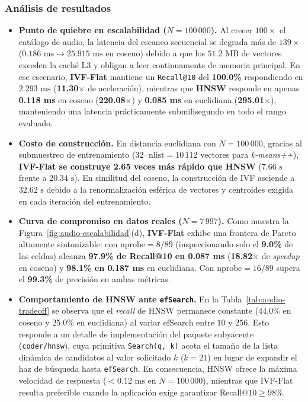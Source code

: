 \documentclass[11pt,a4paper]{article}
\begin{document}
\subsubsection{Análisis de resultados}

\begin{itemize}
  \item \textbf{Punto de quiebre en escalabilidad ($N = 100\,000$).} Al crecer $100\times$ el catálogo de audio, la latencia del escaneo secuencial se degrada más de $139\times$ ($0.186\text{ ms} \rightarrow 25.915\text{ ms}$ en coseno) debido a que los $51.2\text{ MB}$ de vectores exceden la caché L3 y obligan a leer continuamente de memoria principal. En ese escenario, \textbf{IVF-Flat} mantiene un \texttt{Recall@10} del \textbf{100.0\%} respondiendo en $2.293\text{ ms}$ (\textbf{11.30$\times$} de aceleración), mientras que \textbf{HNSW} responde en apenas \textbf{0.118 ms} en coseno (\textbf{220.08$\times$}) y \textbf{0.085 ms} en euclidiana (\textbf{295.01$\times$}), manteniendo una latencia prácticamente submilisegundo en todo el rango evaluado.
  \item \textbf{Costo de construcción.} En distancia euclidiana con $N = 100\,000$, gracias al submuestreo de entrenamiento ($32 \cdot \text{nlist} = 10\,112$ vectores para \emph{k-means++}), \textbf{IVF-Flat se construye 2.65 veces más rápido que HNSW} ($7.66\text{ s}$ frente a $20.34\text{ s}$). En similitud del coseno, la construcción de IVF asciende a $32.62\text{ s}$ debido a la renormalización esférica de vectores y centroides exigida en cada iteración del entrenamiento.
  \item \textbf{Curva de compromiso en datos reales ($N = 7\,997$).} Como muestra la Figura~\ref{fig:audio-escalabilidad}(d), \textbf{IVF-Flat} exhibe una frontera de Pareto altamente sintonizable: con $\text{nprobe} = 8/89$ (inspeccionando solo el \textbf{9.0\%} de las celdas) alcanza \textbf{97.9\% de Recall@10 en 0.087 ms} (\textbf{18.82$\times$} de \emph{speedup} en coseno) y \textbf{98.1\% en 0.187 ms} en euclidiana. Con $\text{nprobe} = 16/89$ supera el \textbf{99.3\%} de precisión en ambas métricas.
  \item \textbf{Comportamiento de HNSW ante \texttt{efSearch}.} En la Tabla~\ref{tab:audio-tradeoff} se observa que el \emph{recall} de HNSW permanece constante ($44.0\%$ en coseno y $25.0\%$ en euclidiana) al variar $\text{efSearch}$ entre $10$ y $256$. Esto responde a un detalle de implementación del paquete subyacente (\texttt{coder/hnsw}), cuya primitiva \texttt{Search(q, k)} acota el tamaño de la lista dinámica de candidatos al valor solicitado $k$ ($k = 21$) en lugar de expandir el haz de búsqueda hasta \texttt{efSearch}. En consecuencia, HNSW ofrece la máxima velocidad de respuesta ($< 0.12\text{ ms}$ en $N = 100\,000$), mientras que IVF-Flat resulta preferible cuando la aplicación exige garantizar $\text{Recall@10} \ge 98\%$.
\end{itemize}
\end{document}
